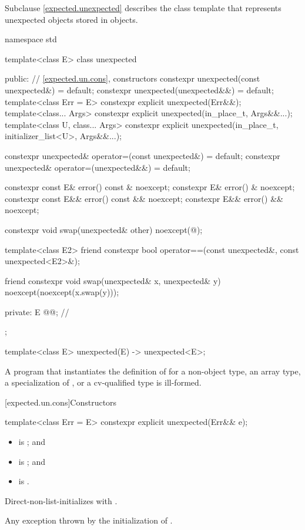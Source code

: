 \pnum
Subclause \ref{expected.unexpected} describes the class template 
that represents unexpected objects stored in  objects.

%
\begin{codeblock}
namespace std {
  template<class E>
  class unexpected {
  public:
    // \ref{expected.un.cons}, constructors
    constexpr unexpected(const unexpected&) = default;
    constexpr unexpected(unexpected&&) = default;
    template<class Err = E>
      constexpr explicit unexpected(Err&&);
    template<class... Args>
      constexpr explicit unexpected(in_place_t, Args&&...);
    template<class U, class... Args>
      constexpr explicit unexpected(in_place_t, initializer_list<U>, Args&&...);

    constexpr unexpected& operator=(const unexpected&) = default;
    constexpr unexpected& operator=(unexpected&&) = default;

    constexpr const E& error() const & noexcept;
    constexpr E& error() & noexcept;
    constexpr const E&& error() const && noexcept;
    constexpr E&& error() && noexcept;

    constexpr void swap(unexpected& other) noexcept(@\seebelow@);

    template<class E2>
      friend constexpr bool operator==(const unexpected&, const unexpected<E2>&);

    friend constexpr void swap(unexpected& x, unexpected& y) noexcept(noexcept(x.swap(y)));

  private:
    E @@;             // \expos
  };

  template<class E> unexpected(E) -> unexpected<E>;
}
\end{codeblock}

\pnum
A program that instantiates the definition of  for
a non-object type,
an array type,
a specialization of , or
a cv-qualified type
is ill-formed.

[expected.un.cons]{Constructors}

%
\begin{itemdecl}
template<class Err = E>
  constexpr explicit unexpected(Err&& e);
\end{itemdecl}

\begin{itemdescr}
\pnum
\constraints
\begin{itemize}
\item
{} is ; and
\item
{} is ; and
\item
{} is .
\end{itemize}

\pnum
\effects
Direct-non-list-initializes  with .

\pnum
\throws
Any exception thrown by the initialization of .
\end{itemdescr}

